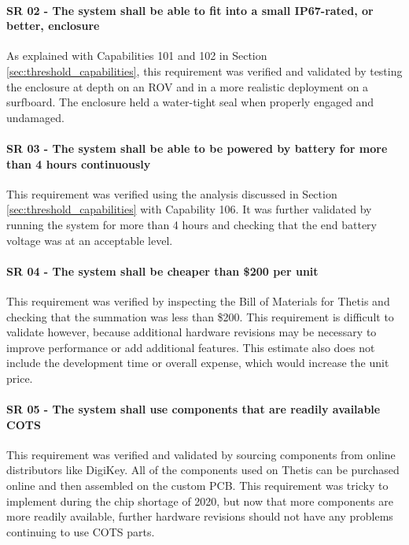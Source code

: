 \paragraph*{SR 02 - The system shall be able to fit into a small IP67-rated, or better, enclosure} As explained with Capabilities 101 and 102 in Section \ref{sec:threshold_capabilities}, this requirement was verified and validated by testing the enclosure at depth on an ROV and in a more realistic deployment on a surfboard.
The enclosure held a water-tight seal when properly engaged and undamaged.

\paragraph*{SR 03 - The system shall be able to be powered by battery for more than 4 hours continuously} This requirement was verified using the analysis discussed in Section \ref{sec:threshold_capabilities} with Capability 106. 
It was further validated by running the system for more than 4 hours and checking that the end battery voltage was at an acceptable level.

\paragraph*{SR 04 - The system shall be cheaper than \$200 per unit} This requirement was verified by inspecting the Bill of Materials for Thetis and checking that the summation was less than \$200.
This requirement is difficult to validate however, because additional hardware revisions may be necessary to improve performance or add additional features.
This estimate also does not include the development time or overall expense, which would increase the unit price.

\paragraph*{SR 05 - The system shall use components that are readily available COTS} This requirement was verified and validated by sourcing components from online distributors like DigiKey.
All of the components used on Thetis can be purchased online and then assembled on the custom PCB. 
This requirement was tricky to implement during the chip shortage of 2020, but now that more components are more readily available, further hardware revisions should not have any problems continuing to use COTS parts.

